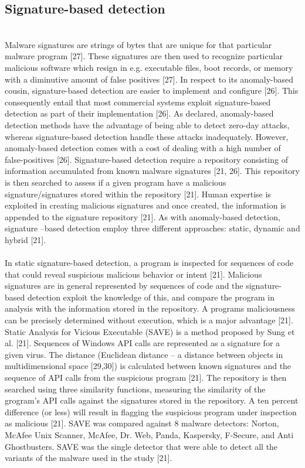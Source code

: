 \documentclass[12pt]{article} %
\begin{document}
\subsection{Signature-based detection}
\\
Malware signatures are strings of bytes that are unique for that particular malware program [27]. These signatures are then used to recognize particular malicious software which resign in e.g. executable files, boot records, or memory with a diminutive amount of false positives [27]. In respect to its anomaly-based cousin, signature-based detection are easier to implement and configure [26]. This consequently entail that most commercial systems exploit signature-based  detection as part of their implementation [26]. As declared, anomaly-based detection methods have the advantage of being able to detect zero-day attacks, whereas signature-based detection handle these attacks inadequately. However, anomaly-based detection comes with a cost of dealing with a high number of false-positives [26]. Signature-based detection require a repository consisting of information accumulated from known malware signatures [21, 26]. This repository is then searched to assess if a given program have a malicious signature/signatures stored within the repository [21]. Human expertise is exploited in creating malicious signatures and once created, the information is appended to the signature repository [21]. As with anomaly-based detection, signature –based detection employ three different approaches: static, dynamic and hybrid [21].
\\ \\
In static signature-based detection, a program is inspected for sequences of code that could reveal suspicious malicious behavior or intent [21]. Malicious signatures are in general represented by sequences of code and the signature-based detection exploit the knowledge of this, and compare the program in analysis with the information stored in the repository. A programs maliciousness can be precisely determined without execution, which is a major advantage [21]. \\
Static Analysis for Vicious Executable (SAVE) is a method proposed by Sung et al. [21]. Sequences of Windows API calls are represented as a signature for a given virus. The distance (Euclidean distance – a distance between objects in multidimensional space [29,30]) is calculated between known signatures and the sequence of API calls from the suspicious program [21]. The repository is then searched using three similarity functions, measuring the similarity of the grogram’s API calls against the signatures stored in the repository. A ten percent difference (or less) will result in flagging the suspicious program under inspection as malicious [21]. SAVE was compared against 8 malware detectors: Norton, McAfee Unix Scanner, McAfee, Dr. Web, Panda, Kaspersky, F-Secure, and Anti Ghostbusters. SAVE was the single detector that were able to detect all the variants of the malware used in the study [21].\\
\end{document}
